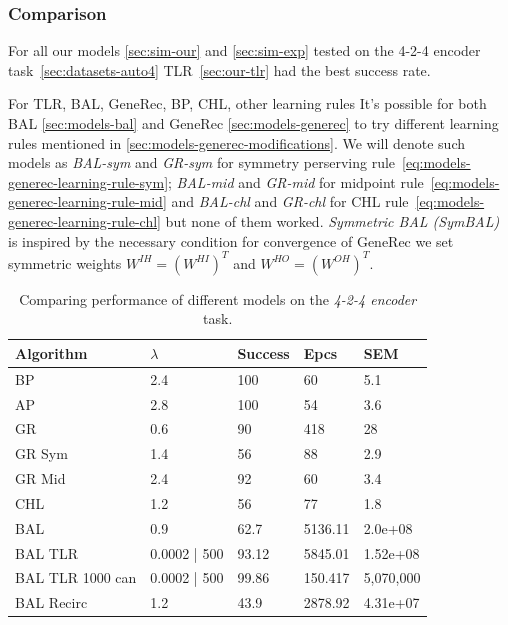\subsubsection{Comparison} 
\label{sec:tlr-auto4-cmp} 

For all our models \ref{sec:sim-our} and \ref{sec:sim-exp} tested on the 4-2-4 encoder task~\ref{sec:datasets-auto4} TLR~\ref{sec:our-tlr} had the best success rate. 

For TLR, BAL, GeneRec, BP, CHL, other learning rules
\label{sec:our-learning-rules}
It's possible for both BAL \ref{sec:models-bal} and GeneRec \ref{sec:models-generec} to try different learning rules mentioned in \ref{sec:models-generec-modifications}. We will denote such models as \emph{BAL-sym} and \emph{GR-sym} for symmetry perserving rule~\ref{eq:models-generec-learning-rule-sym}; \emph{BAL-mid} and \emph{GR-mid} for midpoint rule~\ref{eq:models-generec-learning-rule-mid} and \emph{BAL-chl} and \emph{GR-chl} for CHL rule~\ref{eq:models-generec-learning-rule-chl} but none of them worked. 
\label{sec:our-bal-sym} 
\emph{Symmetric BAL (SymBAL)} is inspired by the necessary condition for convergence of GeneRec \citep{o1996bio} we set symmetric weights $W^{IH} = (W^{HI})^T$ and $W^{HO} = (W^{OH})^T$. 

\begin{table}[H] 
  \centering
    \begin{tabular}{|l|l|l|l|l|}
    \hline
    Algorithm&$\lambda$&Success&Epcs&SEM \\
    \hline
    BP&2.4&100&60&5.1\\
    \hline
    AP&2.8&100&54&3.6\\
    \hline
    GR&0.6&90&418&28\\
    \hline
    GR Sym&1.4&56&88&2.9\\
    \hline
    GR Mid&2.4&92&60&3.4\\
    \hline
    CHL&1.2&56&77&1.8\\
    \hline
    BAL&0.9&62.7& 5136.11&2.0e+08\\
    \hline
    BAL TLR&0.0002 | 500&93.12&5845.01&1.52e+08\\
    \hline
    BAL TLR 1000 can&0.0002 | 500&99.86&150.417&5,070,000\\
    \hline
    BAL Recirc&1.2&43.9&2878.92&4.31e+07\\
    \hline
    \end{tabular}
  \caption{Comparing performance of different models on the \emph{4-2-4 encoder} task.} 
  \label{tab:results-cmp-auto4}
\end{table}

